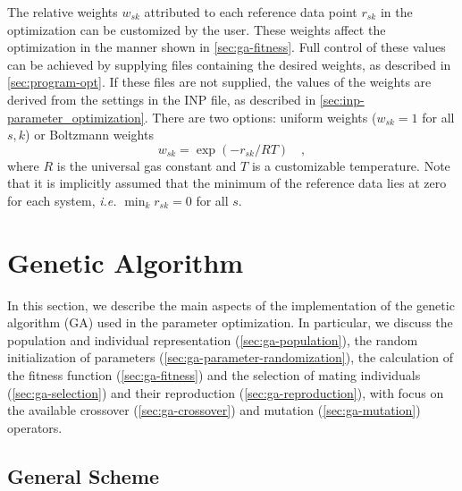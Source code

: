 \documentclass[10pt,a4paper,openany]{memoir}
\numberwithin{equation}{section}
\begin{document}
The relative weights $w_{sk}$ attributed to each reference data point
$r_{sk}$ in the optimization can be customized by the user.  These
weights affect the optimization in the manner shown in \autoref{sec:ga-fitness}.
Full control of these values can be achieved by
supplying files containing the desired weights, as described in
\autoref{sec:program-opt}. If these files are not supplied, the values
of the weights are derived from the settings in the INP file, as
described in \autoref{sec:inp-parameter_optimization}.  There are two
options: uniform weights ($w_{sk} = 1$ for all $s,k$) or Boltzmann
weights
\begin{equation*}
  w_{sk} = \exp{(-r_{sk}/RT)} \quad , 
\end{equation*}
where $R$ is the universal gas constant and $T$ is a customizable temperature.
Note that it is implicitly assumed that the minimum of the reference data
lies at zero for each system, \textit{i.e.} $\min_k{r_{sk}} = 0$ for all $s$.

\section{Genetic Algorithm}
\label{sec:ga}

In this section, we describe the main aspects of the implementation of the
genetic algorithm (GA) used in the parameter optimization.  In particular, we
discuss the population and individual representation
(\autoref{sec:ga-population}), the random initialization of parameters
(\autoref{sec:ga-parameter-randomization}), the calculation of the fitness
function (\autoref{sec:ga-fitness}) and the selection of mating individuals
(\autoref{sec:ga-selection}) and their reproduction
(\autoref{sec:ga-reproduction}), with focus on the available crossover
(\autoref{sec:ga-crossover}) and mutation (\autoref{sec:ga-mutation}) operators.

\subsection{General Scheme}
\label{sec:ga-scheme}
\end{document}

